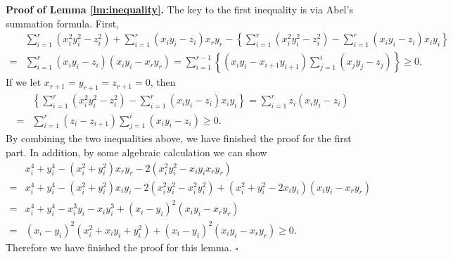 \documentclass[11pt]{article}
\newcommand{\0}{{\mathbf{0}}}
\newcommand{\1}{{\mathbf{1}}}
\begin{document}
{\noindent\bf Proof of Lemma \ref{lm:inequality}.} The key to the first inequality is via Abel's summation formula. First, 
\begin{equation*}
\begin{split}
& \sum_{i=1}^r (x_i^2y_i^2 - z_i^2) + \sum_{i=1}^r (x_iy_i-z_i)x_ry_r - \left\{\sum_{i=1}^r (x_i^2y_i^2 - z_i^2) -  \sum_{i=1}^r (x_iy_i-z_i)x_iy_i\right\}\\
= & \sum_{i=1}^r (x_iy_i - z_i) (x_iy_i - x_ry_r) = \sum_{i=1}^{r-1} \left\{(x_iy_i - x_{i+1}y_{i+1})\sum_{j=1}^i (x_jy_j-z_j)\right\} \geq 0.
\end{split}
\end{equation*}
If we let $x_{r+1} = y_{r+1} = z_{r+1} = 0$, then
\begin{equation*}
\begin{split}
&  \left\{\sum_{i=1}^r (x_i^2y_i^2 - z_i^2) -  \sum_{i=1}^r (x_iy_i-z_i)x_iy_i\right\} = \sum_{i=1}^r z_i(x_iy_i - z_i)\\
= & \sum_{i=1}^r (z_i - z_{i+1}) \sum_{j=1}^i (x_iy_i - z_i) \geq 0.
\end{split}
\end{equation*}
By combining the two inequalities above, we have finished the proof for the first part. In addition, by some algebraic calculation we can show
\begin{equation*}
\begin{split}
& x_i^4 + y_i^4 - (x_i^2 + y_i^2)x_ry_r - 2\left(x_i^2y_i^2 - x_iy_ix_ry_r\right)\\
= & x_i^4 + y_i^4 - (x_i^2 + y_i^2)x_iy_i - 2\left(x_i^2y_i^2 - x_i^2y_i^2\right) + (x_i^2+y_i^2 - 2x_iy_i)(x_iy_i - x_ry_r)\\
= & x_i^4 + y_i^4 - x_i^3y_i - x_iy_i^3 + (x_i-y_i)^2(x_iy_i - x_ry_r)\\
= & (x_i-y_i)^2(x_i^2+x_iy_i + y_i^2) + (x_i-y_i)^2 (x_iy_i-x_ry_r) \geq 0.
\end{split}
\end{equation*} 
Therefore we have finished the proof for this lemma. \quad $\square$

	
\end{document}
